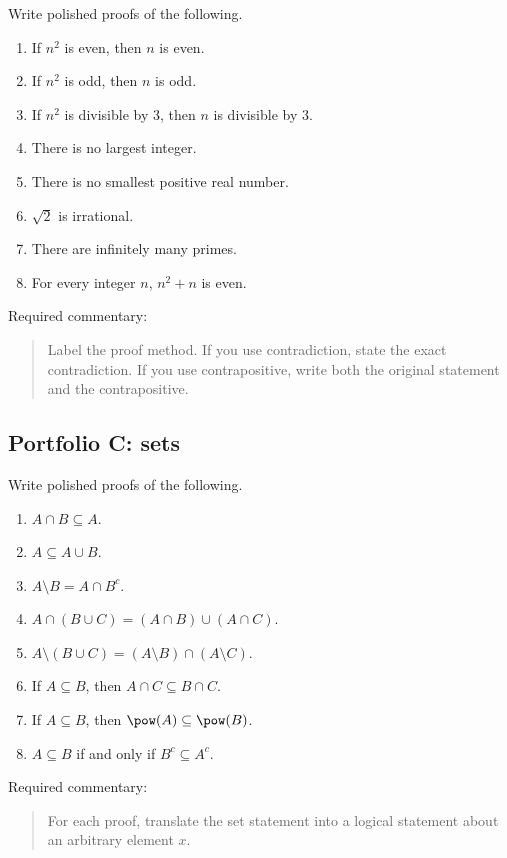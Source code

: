 Write polished proofs of the following.

\begin{enumerate}
\item If $n^2$ is even, then $n$ is even.
\item If $n^2$ is odd, then $n$ is odd.
\item If $n^2$ is divisible by $3$, then $n$ is divisible by $3$.
\item There is no largest integer.
\item There is no smallest positive real number.
\item $\sqrt2$ is irrational.
\item There are infinitely many primes.
\item For every integer $n$, $n^2+n$ is even.
\end{enumerate}

Required commentary:

\begin{quote}
Label the proof method. If you use contradiction, state the exact contradiction. If you use contrapositive, write both the original statement and the contrapositive.
\end{quote}

\subsection{Portfolio C: sets}

Write polished proofs of the following.

\begin{enumerate}
\item $A\cap B\subseteq A$.
\item $A\subseteq A\cup B$.
\item $A\setminus B=A\cap B^c$.
\item $A\cap(B\cup C)=(A\cap B)\cup(A\cap C)$.
\item $A\setminus(B\cup C)=(A\setminus B)\cap(A\setminus C)$.
\item If $A\subseteq B$, then $A\cap C\subseteq B\cap C$.
\item If $A\subseteq B$, then $\pow(A)\subseteq\pow(B)$.
\item $A\subseteq B$ if and only if $B^c\subseteq A^c$.
\end{enumerate}

Required commentary:

\begin{quote}
For each proof, translate the set statement into a logical statement about an arbitrary element $x$.
\end{quote}

